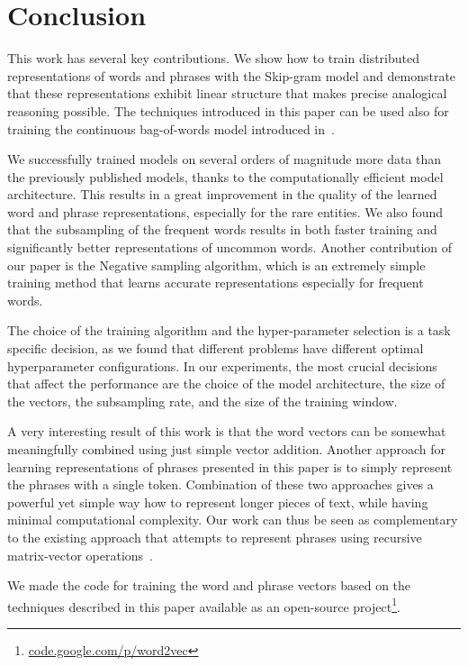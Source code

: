 \documentclass{article}
\begin{document}
\section{Conclusion}

This work has several key contributions.  We show how to train distributed
representations of words and phrases with the Skip-gram model and demonstrate that these
representations exhibit linear structure that makes precise analogical reasoning
possible. The techniques introduced in this paper can be used also for training
the continuous bag-of-words model introduced in~\cite{mikolov}.

We successfully trained models on several orders of magnitude more data than
the previously published models, thanks to the computationally efficient model architecture.
This results in a great improvement in the quality of the learned word and phrase representations,
especially for the rare entities.
We also found that the subsampling of the frequent
words results in both faster training and significantly better representations of uncommon
words. Another contribution of our paper is the Negative sampling algorithm,
which is an extremely simple training method
that learns accurate representations especially for frequent words.

The choice of the training algorithm and the hyper-parameter selection
is a task specific decision, as we found that different problems have
different optimal hyperparameter configurations. In our experiments,
the most crucial decisions that affect the performance are the choice of
the model architecture, the size of the vectors, the subsampling rate,
and the size of the training window.

A very interesting result of this work is that the word vectors
can be somewhat meaningfully combined using
just simple vector addition. Another approach for learning representations
of phrases presented in this paper is to simply represent the phrases with a single
token. Combination of these two approaches gives a powerful yet simple way
how to represent longer pieces of text, while having minimal computational
complexity. Our work can thus be seen as complementary to the existing
approach that attempts to represent phrases using recursive
matrix-vector operations~\cite{socher2}.

We made the code for training the word and phrase vectors based on the techniques
described in this paper available as an open-source project\footnote{\url{code.google.com/p/word2vec}}.

\small


\end{document}
